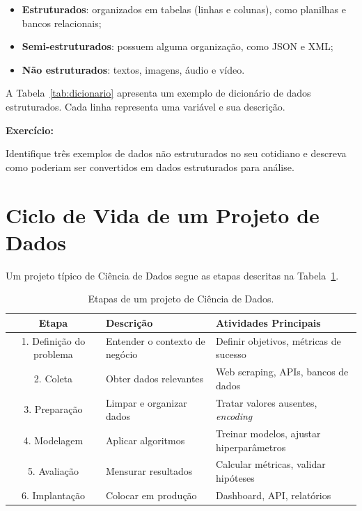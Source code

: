 \documentclass[
    12pt,
    oneside,
    a4paper,
    english,
    brazilian
    ]{abntex2}
\numberwithin{equation}{chapter}
\newenvironment{exercicio}{%
    \par\medskip
    \color{teal!80!black}\small
    \noindent\textbf{Exercício: }\ignorespaces
}{%
    \par\medskip
}
\begin{document}
\begin{itemize}
    \item \textbf{Estruturados}: organizados em tabelas (linhas e colunas), como planilhas e bancos relacionais;
    \item \textbf{Semi-estruturados}: possuem alguma organização, como JSON e XML;
    \item \textbf{Não estruturados}: textos, imagens, áudio e vídeo.
\end{itemize}

A Tabela~\ref{tab:dicionario} apresenta um exemplo de dicionário de dados estruturados. Cada linha representa uma variável e sua descrição.



\begin{exercicio}
Identifique três exemplos de dados não estruturados no seu cotidiano e descreva como poderiam ser convertidos em dados estruturados para análise.
\end{exercicio}

\section{Ciclo de Vida de um Projeto de Dados}

Um projeto típico de Ciência de Dados segue as etapas descritas na Tabela~\ref{tab:pipeline_estrutura}.

\begin{table}[htbp]
\centering
\caption{Etapas de um projeto de Ciência de Dados.}
\label{tab:pipeline_estrutura}
\small
\begin{tabular}{clp{7cm}}
\toprule
\textbf{Etapa} & \textbf{Descrição} & \textbf{Atividades Principais} \\
\midrule
1. Definição do problema & Entender o contexto de negócio & Definir objetivos, métricas de sucesso \\
2. Coleta & Obter dados relevantes & Web scraping, APIs, bancos de dados \\
3. Preparação & Limpar e organizar dados & Tratar valores ausentes, \textit{encoding} \\
4. Modelagem & Aplicar algoritmos & Treinar modelos, ajustar hiperparâmetros \\
5. Avaliação & Mensurar resultados & Calcular métricas, validar hipóteses \\
6. Implantação & Colocar em produção & Dashboard, API, relatórios \\
\bottomrule
\end{tabular}
\end{table}
\end{document}
